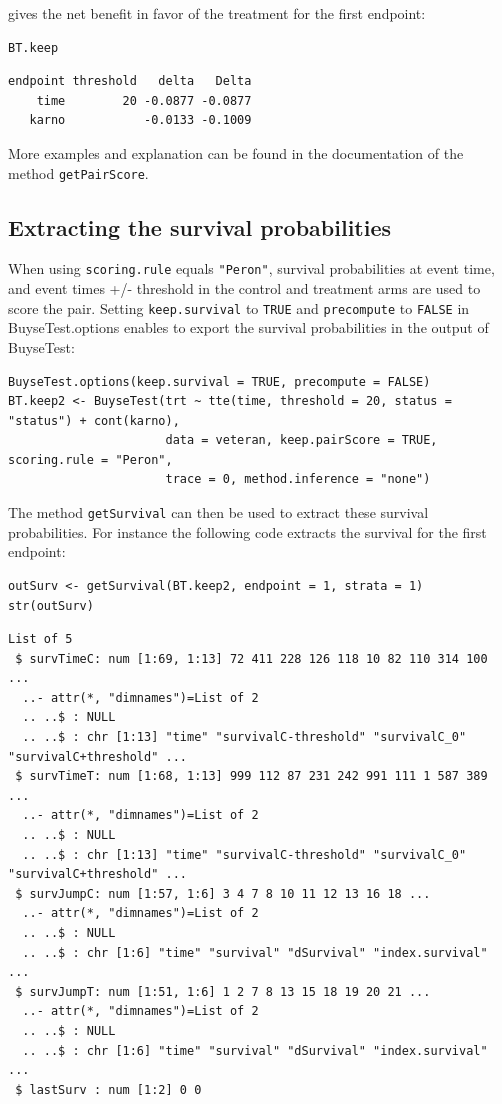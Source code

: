 \documentclass[12pt]{article}
\begin{document}
gives the net benefit in favor of the treatment for the first
endpoint:
\lstset{language=r,label= ,caption= ,captionpos=b,numbers=none}
\begin{lstlisting}
BT.keep
\end{lstlisting}

\begin{verbatim}
endpoint threshold   delta   Delta
    time        20 -0.0877 -0.0877
   karno           -0.0133 -0.1009
\end{verbatim}


More examples and explanation can be found in the documentation of
the method \texttt{getPairScore}.

\subsection{Extracting the survival probabilities}
\label{sec:org66146b5}
When using \texttt{scoring.rule} equals \texttt{"Peron"}, survival probabilities at
event time, and event times +/- threshold in the control and treatment
arms are used to score the pair. Setting \texttt{keep.survival} to \texttt{TRUE} and
\texttt{precompute} to \texttt{FALSE} in BuyseTest.options enables to export the
survival probabilities in the output of BuyseTest:
\lstset{language=r,label= ,caption= ,captionpos=b,numbers=none}
\begin{lstlisting}
BuyseTest.options(keep.survival = TRUE, precompute = FALSE)
BT.keep2 <- BuyseTest(trt ~ tte(time, threshold = 20, status = "status") + cont(karno),
                      data = veteran, keep.pairScore = TRUE, scoring.rule = "Peron",
                      trace = 0, method.inference = "none")
\end{lstlisting}

The method \texttt{getSurvival} can then be used to extract these survival
probabilities. For instance the following code extracts the survival
for the first endpoint:
\lstset{language=r,label= ,caption= ,captionpos=b,numbers=none}
\begin{lstlisting}
outSurv <- getSurvival(BT.keep2, endpoint = 1, strata = 1)
str(outSurv)
\end{lstlisting}

\begin{verbatim}
List of 5
 $ survTimeC: num [1:69, 1:13] 72 411 228 126 118 10 82 110 314 100 ...
  ..- attr(*, "dimnames")=List of 2
  .. ..$ : NULL
  .. ..$ : chr [1:13] "time" "survivalC-threshold" "survivalC_0" "survivalC+threshold" ...
 $ survTimeT: num [1:68, 1:13] 999 112 87 231 242 991 111 1 587 389 ...
  ..- attr(*, "dimnames")=List of 2
  .. ..$ : NULL
  .. ..$ : chr [1:13] "time" "survivalC-threshold" "survivalC_0" "survivalC+threshold" ...
 $ survJumpC: num [1:57, 1:6] 3 4 7 8 10 11 12 13 16 18 ...
  ..- attr(*, "dimnames")=List of 2
  .. ..$ : NULL
  .. ..$ : chr [1:6] "time" "survival" "dSurvival" "index.survival" ...
 $ survJumpT: num [1:51, 1:6] 1 2 7 8 13 15 18 19 20 21 ...
  ..- attr(*, "dimnames")=List of 2
  .. ..$ : NULL
  .. ..$ : chr [1:6] "time" "survival" "dSurvival" "index.survival" ...
 $ lastSurv : num [1:2] 0 0
\end{verbatim}
\end{document}
